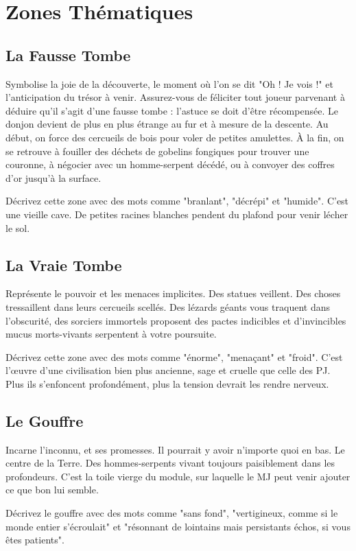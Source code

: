 \section{Zones Thématiques}
\subsection{La Fausse Tombe}
Symbolise la joie de la découverte, le moment où l'on se dit "Oh ! Je vois !" et l'anticipation du trésor à venir.
Assurez-vous de féliciter tout joueur parvenant à déduire qu'il s'agit d'une fausse tombe : l'astuce se doit d'être récompensée.
Le donjon devient de plus en plus étrange au fur et à mesure de la descente.
Au début, on force des cercueils de bois pour voler de petites amulettes.
À la fin, on se retrouve à fouiller des déchets de gobelins fongiques pour trouver une couronne, à négocier avec un homme-serpent décédé, ou à convoyer des coffres d'or jusqu'à la surface.

Décrivez cette zone avec des mots comme "branlant", "décrépi" et "humide".
C'est une vieille cave.
De petites racines blanches pendent du plafond pour venir lécher le sol.

\subsection{La Vraie Tombe}
Représente le pouvoir et les menaces implicites.
Des statues veillent.
Des choses tressaillent dans leurs cercueils scellés.
Des lézards géants vous traquent dans l'obscurité, des sorciers immortels proposent des pactes indicibles et d'invincibles mucus morts-vivants serpentent à votre poursuite.

Décrivez cette zone avec des mots comme "énorme", "menaçant" et "froid".
C'est l'\oe uvre d'une civilisation bien plus ancienne, sage et cruelle que celle des PJ.
Plus ils s'enfoncent profondément, plus la tension devrait les rendre nerveux.

\subsection{Le Gouffre}
Incarne l'inconnu, et ses promesses.
Il pourrait y avoir n'importe quoi en bas.
Le centre de la Terre.
Des hommes-serpents vivant toujours paisiblement dans les profondeurs.
C'est la toile vierge du module, sur laquelle le MJ peut venir ajouter ce que bon lui semble.

Décrivez le gouffre avec des mots comme "sans fond", "vertigineux, comme si le monde entier s'écroulait" et "résonnant
de lointains mais persistants échos, si vous êtes patients".

